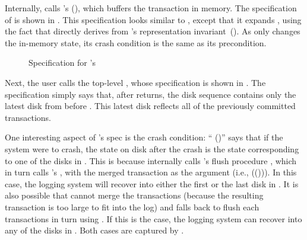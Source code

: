 Internally,  calls \grouplog's
(), which buffers the transaction in memory.
The specification of  is shown in
.  This specification looks similar to
, except that it expands , using the
fact that directly derives from \logapi's representation
invariant~(). As  only changes the
in-memory state, its crash condition is the same as its precondition.

\begin{figure}[htb]
\begin{spec}
\end{spec}
\caption{Specification for \grouplog's }
\label{fig:spec_group_commit}
\end{figure}

Next, the user calls the top-level , whose specification is
shown in .  The specification simply says that,
after  returns, the disk sequence contains only the latest
disk from before . This latest disk reflects all of the
previously committed transactions.

One interesting aspect of 's spec is the crash condition:
`` ()'' says that if the system were
to crash, the state on disk after the crash is the state corresponding to
one of the disks in .  This is because 
internally calls \grouplog's flush procedure , which in
turn calls \memlog's , with the merged transaction as
the argument (i.e.,
(())). In this case, the
logging system will recover into either the first or the last disk in
.  It is also possible that \grouplog cannot merge the
transactions (because the resulting transaction is too large to fit into
the log) and falls back to flush each transactions in turn using
.  If this is the case, the logging system can recover
into any of the disks in .  Both cases are captured by
.

